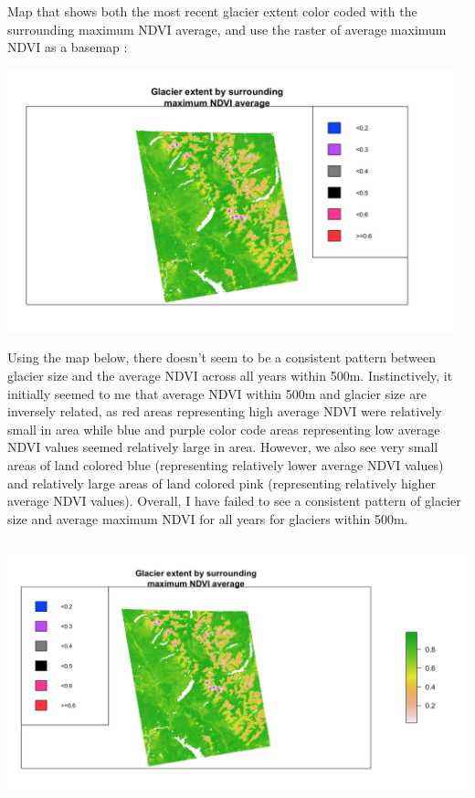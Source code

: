 \documentclass[11pt]{article}
\begin{document}
Map that shows both the most recent glacier extent color coded with the surrounding maximum
NDVI average, and use the raster of average maximum NDVI as a basemap :

\begin{center}
\includegraphics[height=3in]{q11.png}
\end{center}

Using the map below, there doesn’t seem to be a consistent pattern between glacier size and
the average NDVI across all years within 500m. Instinctively, it initially seemed to me that
average NDVI within 500m and glacier size are inversely related, as red areas representing high
average NDVI were relatively small in area while blue and purple color code areas representing
low average NDVI values seemed relatively large in area. However, we also see very small
areas of land colored blue (representing relatively lower average NDVI values) and relatively
large areas of land colored pink (representing relatively higher average NDVI values). Overall, I
have failed to see a consistent pattern of glacier size and average maximum NDVI for all years
for glaciers within 500m.

\begin{center}
\includegraphics[height=3in]{q11_2.png}
\end{center}
\end{document}
